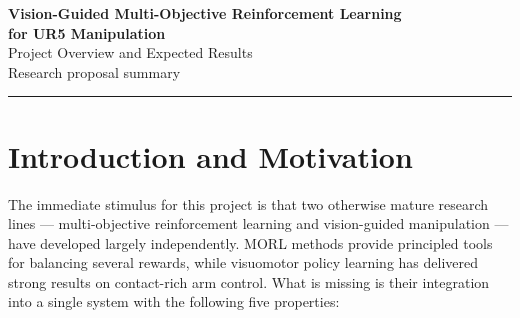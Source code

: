 \documentclass[11pt,a4paper]{article}
\begin{document}
\begin{center}
  {\LARGE\bfseries Vision-Guided Multi-Objective Reinforcement
  Learning\\[0.1em] for UR5 Manipulation}\\[0.4em]
  {\large Project Overview and Expected Results}\\
  \vspace{0.2em}
  {\small Research proposal summary}
\end{center}

\vspace{0.4em}
\noindent\rule{\linewidth}{1pt}
\vspace{0.6em}

\begin{abstract}
Real-world robot manipulation requires a robot to achieve its task while
balancing conflicting objectives such as task success, energy consumption,
movement smoothness, and safety. The literature provides each of the
required capabilities --- vision-guided control, multi-objective
reinforcement learning (MORL), 6-DoF manipulation, preference
conditioning, and safety as a constraint --- but no existing system
combines all of them on an articulated arm operating in dynamic scenes.
This project proposes a preference-conditioned, vision-guided
multi-objective policy for a UR5 robot, built on a 3D point-cloud
representation, a multi-objective critic, a diffusion-based visuomotor
policy, and a constrained-MDP formulation of safety. The expected
outcomes, including a target of at least 70\% static success on the real
robot and a hypervolume at or above existing MORL baselines, are
hypotheses to be confirmed by experiment rather than measured results.
\end{abstract}

\section{Introduction and Motivation}

The immediate stimulus for this project is that two otherwise mature
research lines --- multi-objective reinforcement learning and
vision-guided manipulation --- have developed largely independently.
MORL methods provide principled tools for balancing several rewards,
while visuomotor policy learning has delivered strong results on
contact-rich arm control. What is missing is their integration into a
single system with the following five properties:
\end{document}
